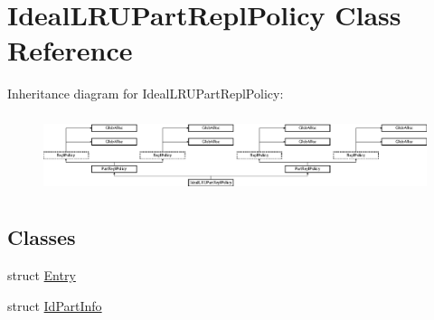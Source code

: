 \hypertarget{classIdealLRUPartReplPolicy}{\section{Ideal\-L\-R\-U\-Part\-Repl\-Policy Class Reference}
\label{classIdealLRUPartReplPolicy}
}
Inheritance diagram for Ideal\-L\-R\-U\-Part\-Repl\-Policy\-:\begin{figure}[H]
\begin{center}
\leavevmode
\includegraphics[height=2.287582cm]{classIdealLRUPartReplPolicy}
\end{center}
\end{figure}
\subsection*{Classes}
\begin{DoxyCompactItemize}
\item 
struct \hyperlink{structIdealLRUPartReplPolicy_1_1Entry}{Entry}
\item 
struct \hyperlink{structIdealLRUPartReplPolicy_1_1IdPartInfo}{Id\-Part\-Info}
\end{DoxyCompactItemize}

